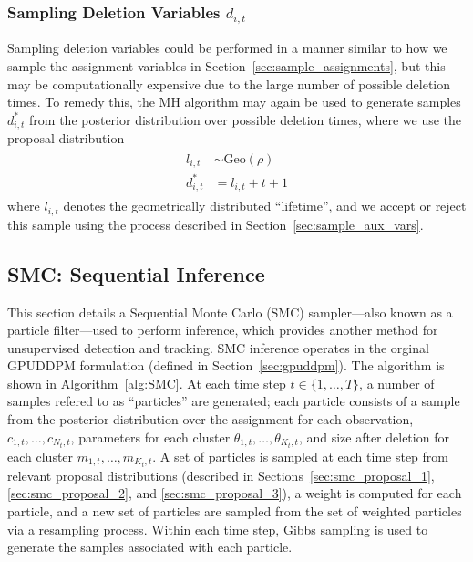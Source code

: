 \documentclass[twocolumn, final]{svjour3}
\begin{document}

\subsubsection{Sampling Deletion Variables $d_{i,t}$}
Sampling deletion variables could be performed in a manner similar to how we sample the assignment variables in Section~\ref{sec:sample_assignments}, but this may be computationally expensive due to the large number of possible deletion times. To remedy this, the MH algorithm may again be used to generate samples $d_{i,t}^{*}$ from the posterior distribution over possible deletion times, where we use the proposal distribution
\begin{align}
\begin{split}
l_{i,t}  &\sim  \text{Geo}(\rho)  \\
d_{i,t}^{*}  &= l_{i,t} + t + 1
\end{split}
\end{align}
where $l_{i,t}$ denotes the geometrically distributed ``lifetime'', and we accept or reject this sample using the process described in Section~\ref{sec:sample_aux_vars}.


\subsection{SMC: Sequential Inference}
\label{sec:SMC}

This section details a Sequential Monte Carlo (SMC) sampler---also known as a particle filter---used to perform inference, which provides another method for unsupervised detection and tracking. SMC inference operates in the orginal GPUDDPM formulation (defined in Section~\ref{sec:gpuddpm}). The algorithm is shown in Algorithm~\ref{alg:SMC}. At each time step $t \in \{ 1, \ldots, T \}$, a number of samples refered to as ``particles'' are generated; each particle consists of a sample from the posterior distribution over the assignment for each observation, $c_{1,t}, \ldots, c_{N_{t}, t}$, parameters for each cluster $\theta_{1,t}, \ldots, \theta_{K_{t}, t}$, and size after deletion for each cluster $m_{1,t}, \ldots, m_{K_{t},t}$. A set of particles is sampled at each time step from relevant proposal distributions (described in Sections~\ref{sec:smc_proposal_1}, \ref{sec:smc_proposal_2}, and \ref{sec:smc_proposal_3}), a weight is computed for each particle, and a new set of particles are sampled from the set of weighted particles via a resampling process. Within each time step, Gibbs sampling is used to generate the samples associated with each particle.
\end{document}
